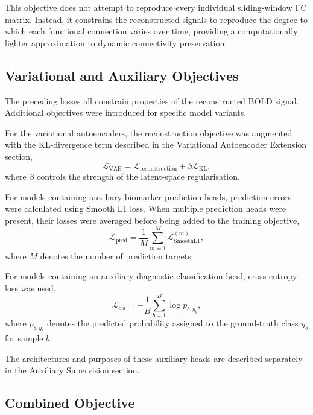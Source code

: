 This objective does not attempt to reproduce every individual
sliding-window FC matrix. Instead, it constrains the reconstructed signals
to reproduce the degree to which each functional connection varies over
time, providing a computationally lighter approximation to dynamic
connectivity preservation.

\subsection{Variational and Auxiliary Objectives}

The preceding losses all constrain properties of the reconstructed BOLD
signal. Additional objectives were introduced for specific model variants.

For the variational autoencoders, the reconstruction objective was
augmented with the KL-divergence term described in the Variational
Autoencoder Extension section,
\begin{equation}
    \mathcal{L}_{\mathrm{VAE}}
    =
    \mathcal{L}_{\mathrm{reconstruction}}
    +
    \beta\mathcal{L}_{\mathrm{KL}},
\end{equation}
where $\beta$ controls the strength of the latent-space regularisation.

For models containing auxiliary biomarker-prediction heads, prediction
errors were calculated using Smooth L1 loss. When multiple prediction
heads were present, their losses were averaged before being added to the
training objective,
\begin{equation}
    \mathcal{L}_{\mathrm{pred}}
    =
    \frac{1}{M}
    \sum_{m=1}^{M}
    \mathcal{L}_{\mathrm{SmoothL1}}^{(m)},
\end{equation}
where $M$ denotes the number of prediction targets.

For models containing an auxiliary diagnostic classification head,
cross-entropy loss was used,
\begin{equation}
    \mathcal{L}_{\mathrm{cls}}
    =
    -\frac{1}{B}
    \sum_{b=1}^{B}
    \log p_{b,y_b},
\end{equation}
where $p_{b,y_b}$ denotes the predicted probability assigned to the
ground-truth class $y_b$ for sample $b$.

The architectures and purposes of these auxiliary heads are described
separately in the Auxiliary Supervision section.

\subsection{Combined Objective}

